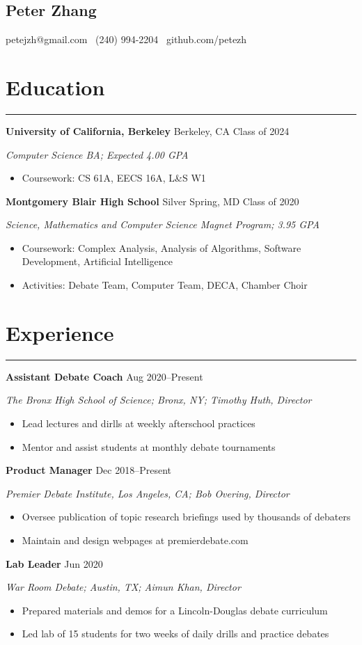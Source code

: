 \documentclass[11pt]{article}
\newcommand{\name}[1]{\begin{center}\section*{\huge \color{highlight} #1}\end{center}}
\newcommand{\topinfo}[1]{\begin{center}\vspace{-0.2cm}#1\vspace{-0.2cm}\end{center}}
\newcommand{\resumesection}[1]{\vspace{-0.3cm}\section*{\color{highlight}#1}\vspace{-0.3cm}\hrule\vspace{0.3cm}}
\begin{document}
\name{Peter Zhang}
\topinfo{petejzh@gmail.com \textbullet\ (240) 994-2204 \textbullet\ github.com/petezh}

\resumesection{Education}

\textbf{University of California, Berkeley} Berkeley, CA \hfill Class of 2024 \par
\textit{Computer Science BA; Expected 4.00 GPA}
\begin{itemize}
	\item Coursework: CS 61A, EECS 16A, L\&S W1
\end{itemize}

\textbf{Montgomery Blair High School} Silver Spring, MD \hfill Class of 2020 \par
\textit{Science, Mathematics and Computer Science Magnet Program; 3.95 GPA}

\begin{itemize}
	\item Coursework: Complex Analysis, Analysis of Algorithms, Software Development, Artificial Intelligence
	\item Activities: Debate Team, Computer Team, DECA, Chamber Choir
\end{itemize}

\resumesection{Experience}

\textbf{Assistant Debate Coach}  \hfill Aug 2020--Present \par
\textit{The Bronx High School of Science; Bronx, NY; Timothy Huth, Director}
\begin{itemize}
	\item Lead lectures and dirlls at weekly afterschool practices
	\item Mentor and assist students at monthly debate tournaments
\end{itemize}

\textbf{Product Manager}   \hfill Dec 2018--Present \par
\textit{Premier Debate Institute, Los Angeles, CA; Bob Overing, Director}
\begin{itemize}
	\item Oversee publication of topic research briefings used by thousands of debaters
	\item Maintain and design webpages at premierdebate.com
\end{itemize}

\textbf{Lab Leader}  \hfill Jun 2020 \par
\textit{War Room Debate; Austin, TX; Aimun Khan, Director}
\begin{itemize}
	\item Prepared materials and demos for a Lincoln-Douglas debate curriculum
	\item Led lab of 15 students for two weeks of daily drills and practice debates
\end{itemize}
\end{document}

